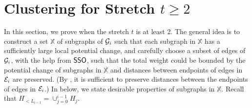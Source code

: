 
\section{Clustering for Stretch $t\geq 2$}\label{sec:stretch2}

In this section, we prove  when the stretch $t$ is at least 2. The general idea is to construct a set $\mathbb{X}$ of subgraphs  of $\mathcal{G}_i$ such that each subgraph in $\mathbb{X}$ has a sufficiently large local potential change, and carefully choose a subset of edges of $\mathcal{G}_i$, with the help from \hyperlink{SPHigh}{$\mathsf{SSO}$}, such that the total weight could be bounded by the potential change of subgraphs in $\mathbb{X}$ and distances between endpoints of edges in $\mathcal{E}_i$ are preserved. (By , it is sufficient to preserve distances between the endpoints of edges in $\mathcal{E}_i$.)  In  below, we state desirable properties of subgraphs in $\mathbb{X}$. Recall that $H_{< L_{i-1}} = \cup_{j=0}^{i-1} H_{j}$. 




